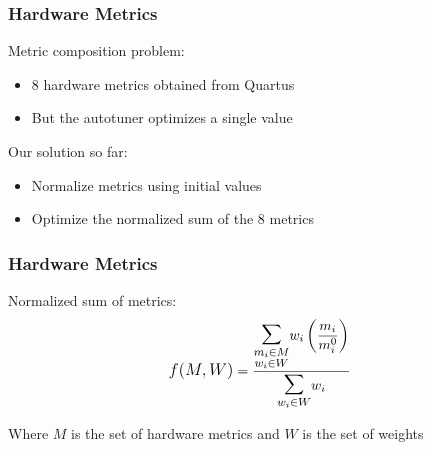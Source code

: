 \documentclass[10pt, compress, xcolor={table,xcdraw,usenames}, aspectratio=169]{beamer}
\begin{document}
\begin{frame}
    \frametitle{Hardware Metrics}
    \begin{block}{\alert{Metric composition} problem:}
        \begin{itemize}
            \item \alert{8 hardware metrics} obtained from Quartus
            \item But the autotuner optimizes \alert{a single value}
        \end{itemize}
    \end{block}

    \begin{block}{Our \alert{solution} so far:}
        \begin{itemize}
            \item \alert{Normalize} metrics using initial values
            \item Optimize the \alert{normalized sum} of the 8 metrics
        \end{itemize}
    \end{block}
\end{frame}

\begin{frame}
    \frametitle{Hardware Metrics}
    \begin{block}{\alert{Normalized sum} of metrics:}
        \begin{align*} \label{eq:wnsm}
            \mathlarger{f(M, W)} = \frac{\mathlarger{\mathlarger{\mathlarger{\sum}}}\limits_{\substack{m_i \in M \\ w_i \in W}}{w_i\left(\dfrac{m_i}{m_{i}^{0}}\right)}}{\mathlarger{\mathlarger{\mathlarger{\sum}}}\limits_{w_i \in W}{w_i}}
        \end{align*}

        \begin{center}
            Where $M$ is the set of \alert{hardware metrics} and $W$ is the set
            of \alert{weights}
        \end{center}
    \end{block}
\end{frame}
\end{document}
